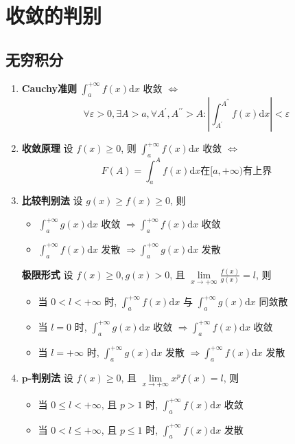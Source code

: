 \documentclass{article}
\begin{document}
	\section{收敛的判别}
			\subsection{无穷积分}
			\begin{enumerate}
				\item \textbf{Cauchy准则} $\int_{a}^{+\infty} f(x) \mathrm{d} x$ 收敛 $\Leftrightarrow$
				$$
				\forall \varepsilon>0, \exists A>a, \forall A^{\prime}, A^{\prime \prime}>A:\left|\int_{A^{\prime}}^{A^{\prime \prime}} f(x) \mathrm{d} x\right|<\varepsilon
				$$
				\item \textbf{收敛原理} 设 $f(x) \geq 0$, 则 $\int_{a}^{+\infty} f(x) \mathrm{d} x$ 收敛 $\Leftrightarrow$
				$$
				F(A)=\int_{a}^{A} f(x) \mathrm{d} x \text{在} [a, +\infty) \text{有上界}
				$$
				\item \textbf{比较判别法} 设 $g(x) \geq f(x) \geq 0$, 则
				\begin{itemize}
					\item$\int_{a}^{+\infty} g(x) \mathrm{d} x$ 收敛 $\Rightarrow \int_{a}^{+\infty} f(x) \mathrm{d} x$ 收敛
					\item$\int_{a}^{+\infty} f(x) \mathrm{d} x$ 发散 $\Rightarrow \int_{a}^{+\infty} g(x) \mathrm{d} x$ 发散
				\end{itemize}
				\textbf{极限形式} 设 $f(x) \geq 0, g(x)>0$, 且 $\underset{x \rightarrow+\infty}{\lim} \frac{f(x)}{g(x)}=l$, 则
				\begin{itemize}
					\item 当 $0<l<+\infty$ 时, $\int_{a}^{+\infty} f(x) \mathrm{d} x$ 与 $\int_{a}^{+\infty} g(x) \mathrm{d} x$ 同敛散
					\item 当 $l=0$ 时, $\int_{a}^{+\infty} g(x) \mathrm{d} x$ 收敛 $\Rightarrow \int_{a}^{+\infty} f(x) \mathrm{d} x$ 收敛
					\item 当 $l=+\infty$ 时, $\int_{a}^{+\infty} g(x) \mathrm{d} x$ 发散 $\Rightarrow \int_{a}^{+\infty} f(x) \mathrm{d} x$ 发散
				\end{itemize}
				\item \textbf{$\boldsymbol p$-判别法} 设 $f(x) \geq 0$, 且 $\underset{x \rightarrow+\infty}{\lim} x^{p} f(x)=l$, 则
				\begin{itemize}
					\item 当 $0 \leq l<+\infty$, 且 $p>1$ 时, $\int_{a}^{+\infty} f(x) \mathrm{d} x$ 收敛
					\item 当 $0<l \leq+\infty$, 且 $p \leq 1$ 时, $\int_{a}^{+\infty} f(x) \mathrm{d} x$ 发散

\end{itemize}
\end{enumerate}
\end{document}
